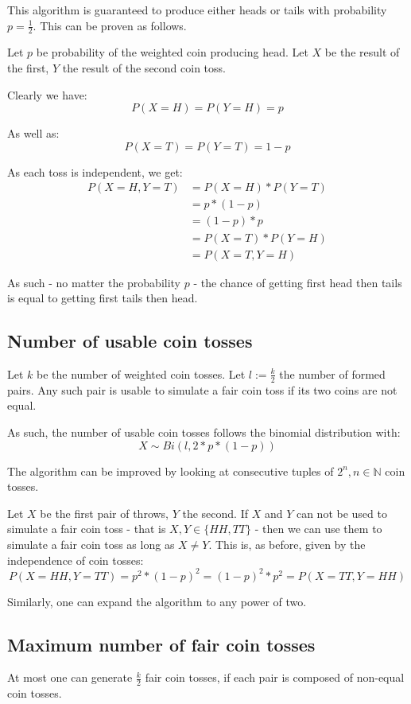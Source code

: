 \documentclass[a4paper]{scrreprt}
\begin{document}
This algorithm is guaranteed to produce either heads or tails with probability
$p = \frac{1}{2}$. This can be proven as follows.

Let $p$ be probability of the weighted coin producing head. Let $X$ be the
result of the first, $Y$ the result of the second coin toss.

Clearly we have:
\[
	P(X=H) = P(Y=H) = p
\]

As well as:
\[
	P(X=T) = P(Y=T) = 1-p
\]

As each toss is independent, we get:
\begin{align*}
	P(X=H, Y=T) & = P(X=H) * P(Y=T) \\
	& = p * (1-p) \\
	& = (1-p) * p \\
	& = P(X=T) * P(Y=H) \\
	& = P(X=T, Y=H)
\end{align*}

As such - no matter the probability $p$ - the chance of getting first head then
tails is equal to getting first tails then head.

\subsection{Number of usable coin tosses}

Let $k$ be the number of weighted coin tosses. Let $l := \frac{k}{2}$ the
number of formed pairs. Any such pair is usable to simulate a fair coin toss if
its two coins are not equal.

As such, the number of usable coin tosses follows the binomial distribution
with:
\[
	X \sim Bi(l, 2 * p * (1-p))
\]

The algorithm can be improved by looking at consecutive tuples of $2^n, n \in
\mathbb{N}$ coin tosses.

Let $X$ be the first pair of throws, $Y$ the second. If $X$ and $Y$ can not be
used to simulate a fair coin toss - that is $X, Y \in \{HH, TT\}$ - then we can
use them to simulate a fair coin toss as long as $X \neq Y$. This is, as
before, given by the independence of coin tosses:
\[
	P(X=HH, Y=TT) = p^2 * (1-p)^2 = (1-p)^2 * p^2 = P(X=TT, Y=HH)
\]

Similarly, one can expand the algorithm to any power of two.

\subsection{Maximum number of fair coin tosses}

At most one can generate $\frac{k}{2}$ fair coin tosses, if each pair is
composed of non-equal coin tosses.
\end{document}
